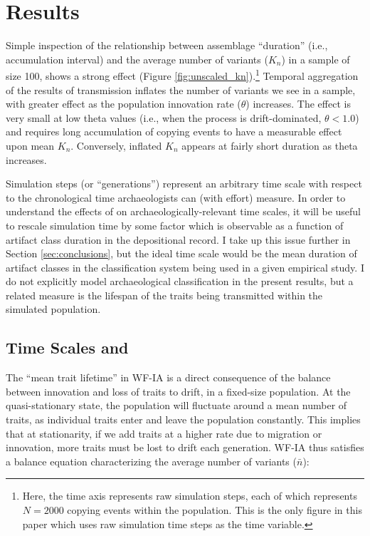 \section{Results}
\label{sec:results}

Simple inspection of the relationship between assemblage ``duration'' (i.e., accumulation interval) and the average number of variants ($K_n$) in a sample of size 100, shows a strong \timeav effect (Figure \ref{fig:unscaled_kn}).\footnote{Here, the time axis represents raw simulation steps, each of which represents $N = 2000$ copying events within the population.  This is the only figure in this paper which uses raw simulation time steps as the time variable.}  Temporal aggregation of the results of transmission inflates the number of variants we see in a sample, with greater effect as the population innovation rate ($\theta$) increases.  The effect is very small at low theta values (i.e., when the process is drift-dominated, $\theta < 1.0$) and requires long accumulation of copying events to have a measurable effect upon mean $K_n$.  
Conversely, inflated $K_n$ appears at fairly short duration as theta increases.  

Simulation steps (or ``generations'') represent an arbitrary time scale with respect to the chronological time archaeologists can (with effort) measure.   In order to understand the effects of \timeav on archaeologically-relevant time scales, it will be useful to rescale simulation time by some factor which is observable as a function of artifact class duration in the depositional record.  I take up this issue further in Section \ref{sec:conclusions}, but the ideal time scale would be the mean duration of artifact classes in the classification system being used in a given empirical study.   I do not explicitly model archaeological classification in the present results, but a related measure is the lifespan of the traits being transmitted within the simulated population.  

\subsection{Time Scales and \Timeav}

The ``mean trait lifetime'' in WF-IA is a direct consequence of the balance between innovation and loss of traits to drift, in a fixed-size population.  At the quasi-stationary state, the population will fluctuate around a mean number of traits, as individual traits enter and leave the population constantly.  This implies that at stationarity, if we add traits at a higher rate due to migration or innovation, more traits must be lost to drift each generation.  WF-IA thus satisfies a balance equation characterizing the average number of variants ($\bar{n}$)\citep{ewens1964maintenance}:

